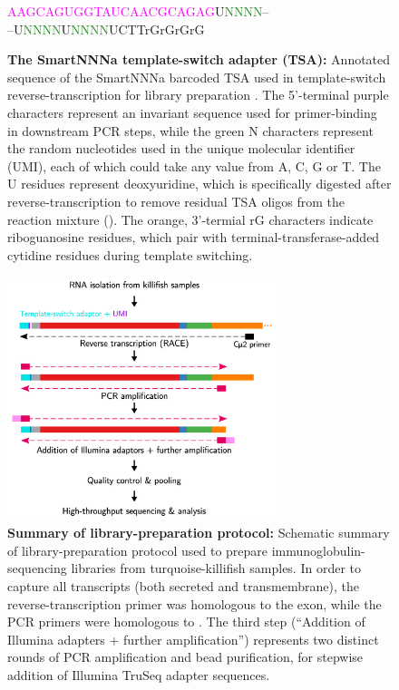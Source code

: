 \begin{figure}
\begin{center}
\LARGE
\textcolor{Fuchsia}{AAGCAGUGGTAUCAACGCAGAG}U\textcolor{ForestGreen}{NNNN}--\\--U\textcolor{ForestGreen}{NNNN}U\textcolor{ForestGreen}{NNNN}UCTT\textcolor{BurntOrange}{rGrGrGrG}
\end{center}
\caption[The SmartNNNa template-switch adapter (TSA)]{\textbf{The SmartNNNa template-switch adapter (TSA):} Annotated sequence of the SmartNNNa barcoded TSA used in template-switch reverse-transcription for \igseq library preparation \parencite{turchaninova2016igprep}. The 5'-terminal purple characters represent an invariant sequence used for primer-binding in downstream PCR steps, while the green N characters represent the random nucleotides used in the unique molecular identifier (UMI), each of which could take any value from A, C, G or T. The U residues represent deoxyuridine, which is specifically digested after reverse-transcription to remove residual TSA oligos from the reaction mixture (). The orange, 3'-termial rG characters indicate riboguanosine residues, which pair with terminal-transferase-added cytidine residues during template switching.}
\label{fig:igseq-tsa-sequence}
\end{figure}

\begin{figure}
\centering
\includegraphics[width=0.7\textwidth]{_Figures/png_edited/igrace-pipeline-narrow}
\caption[Summary of \igseq library-preparation protocol]{\textbf{Summary of \igseq library-preparation protocol:} Schematic summary of library-preparation protocol used to prepare immunoglobulin-sequencing libraries from turquoise-killifish samples. In order to capture all  transcripts (both secreted and transmembrane), the reverse-transcription primer was homologous to the  exon, while the PCR primers were homologous to . The third step (``Addition of Illumina adapters + further amplification'') represents two distinct rounds of PCR amplification and bead purification, for stepwise addition of Illumina TruSeq adapter sequences.}
\label{fig:igrace-pipeline}
\vspace{0.5em}
\end{figure}

